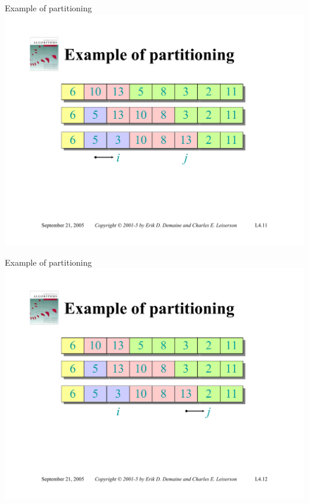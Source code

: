 \documentclass{beamer}
\begin{document}
\begin{frame}{Example of partitioning}
    \centering
    \includegraphics[width=\textwidth, trim={2.75cm 1.80cm 2.75cm 5.00cm}, clip]{pages/lec4_11}
\end{frame}
\begin{frame}{Example of partitioning}
    \centering
    \includegraphics[width=\textwidth, trim={2.75cm 1.80cm 2.75cm 5.00cm}, clip]{pages/lec4_12}
\end{frame}
\end{document}
